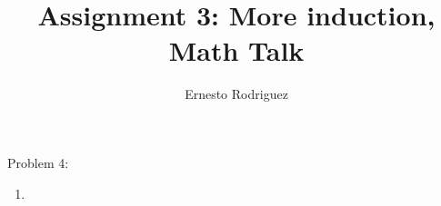 \documentclass{article}
\title{Assignment 3: More induction, Math Talk}
\author{Ernesto Rodriguez}
\begin{document}
\maketitle

Problem 4:

\begin{enumerate}

\item{}

\end{enumerate}
\end{document}
